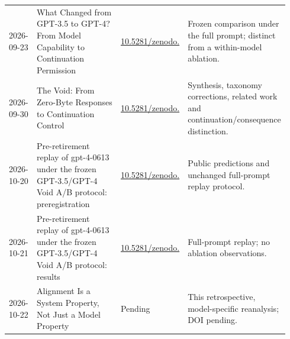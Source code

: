 \begin{longtable}{@{}p{0.105\linewidth}p{0.39\linewidth}p{0.17\linewidth}p{0.28\linewidth}@{}}
2026-09-23 & What Changed from GPT-3.5 to GPT-4? From Model Capability to Continuation Permission & \href{https://doi.org/10.5281/zenodo.22912683}{10.5281/zenodo.\newline 22912683} & Frozen comparison under the full prompt; distinct from a within-model ablation. \\[0.4em]
2026-09-30 & The Void: From Zero-Byte Responses to Continuation Control & \href{https://doi.org/10.5281/zenodo.23070524}{10.5281/zenodo.\newline 23070524} & Synthesis, taxonomy corrections, related work and continuation/consequence distinction. \\[0.4em]
2026-10-20 & Pre-retirement replay of gpt-4-0613 under the frozen GPT-3.5/GPT-4 Void A/B protocol: preregistration & \href{https://doi.org/10.5281/zenodo.23521144}{10.5281/zenodo.\newline 23521144} & Public predictions and unchanged full-prompt replay protocol. \\[0.4em]
2026-10-21 & Pre-retirement replay of gpt-4-0613 under the frozen GPT-3.5/GPT-4 Void A/B protocol: results & \href{https://doi.org/10.5281/zenodo.23521616}{10.5281/zenodo.\newline 23521616} & Full-prompt replay; no ablation observations. \\[0.4em]
2026-10-22 & Alignment Is a System Property, Not Just a Model Property & Pending & This retrospective, model-specific reanalysis; DOI pending. \\[0.4em]
\bottomrule\end{longtable}
